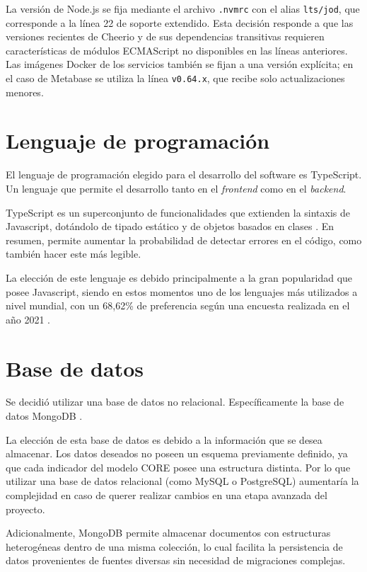 \documentclass[12pt,letterpaper,oneside]{report}
\begin{document}
La versi\'on de Node.js se fija mediante el archivo \texttt{.nvmrc} con el alias \texttt{lts/jod}, que corresponde a la l\'inea 22 de soporte extendido. Esta decisi\'on responde a que las versiones recientes de Cheerio y de sus dependencias transitivas requieren caracter\'isticas de m\'odulos ECMAScript no disponibles en las l\'ineas anteriores. Las im\'agenes Docker de los servicios tambi\'en se fijan a una versi\'on expl\'icita; en el caso de Metabase se utiliza la l\'inea \texttt{v0.64.x}, que recibe solo actualizaciones menores.

\section{Lenguaje de programaci\'on}
\label{sec:lenguaje}

El lenguaje de programaci\'on elegido para el desarrollo del software es TypeScript. Un lenguaje que permite el desarrollo tanto en el \textit{frontend} como en el \textit{backend}.

TypeScript es un superconjunto de funcionalidades que extienden la sintaxis de Javascript, dot\'andolo de tipado est\'atico y de objetos basados en clases \parencite{typescript}. En resumen, permite aumentar la probabilidad de detectar errores en el c\'odigo, como tambi\'en hacer este m\'as legible.

La elecci\'on de este lenguaje es debido principalmente a la gran popularidad que posee Javascript, siendo en estos momentos uno de los lenguajes m\'as utilizados a nivel mundial, con un 68,62\% de preferencia seg\'un una encuesta realizada en el a\~no 2021 \parencite{stackoverflow2021}.

\section{Base de datos}
\label{sec:base-datos}

Se decidi\'o utilizar una base de datos no relacional. Espec\'ificamente la base de datos MongoDB \parencite{mongodb}.

La elecci\'on de esta base de datos es debido a la informaci\'on que se desea almacenar. Los datos deseados no poseen un esquema previamente definido, ya que cada indicador del modelo CORE posee una estructura distinta. Por lo que utilizar una base de datos relacional (como MySQL o PostgreSQL) aumentar\'ia la complejidad en caso de querer realizar cambios en una etapa avanzada del proyecto.

Adicionalmente, MongoDB permite almacenar documentos con estructuras heterog\'eneas dentro de una misma colecci\'on, lo cual facilita la persistencia de datos provenientes de fuentes diversas sin necesidad de migraciones complejas.
\end{document}
